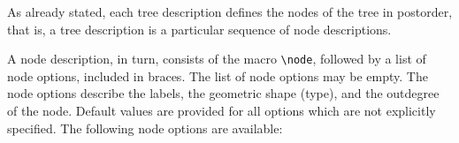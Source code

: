 As already stated, each tree description defines the nodes of the tree in                        
postorder, that is, a tree description is a particular sequence of node         
descriptions.                                                                   
                                                                                
A node description, in turn, consists of the macro \verb.\node.,                
followed by a list of node options, included in braces. The list                
of node options may be empty. The node options describe the labels,             
the geometric shape (type), and the outdegree of the node. Default values are   
provided for all options which are not explicitly specified.                    
The following node options are available:                                       
                                                                                
